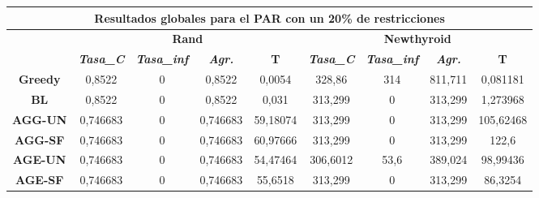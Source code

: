 \documentclass[12pt, spanish]{article}
\begin{document}
\begin{table}[H]
\footnotesize
\begin{tabular}{|c|c|c|c|c|c|c|c|c|}
\hline
\multicolumn{9}{|c|}{\textbf{Resultados globales para el PAR con un 20\% de restricciones}}                                                                                                                           \\ \hline
\multirow{2}{*}{}     & \multicolumn{4}{c|}{\textbf{Rand}}                                                            & \multicolumn{4}{c|}{\textbf{Newthyroid}}                                                      \\ \cline{2-9} 
                      & \textit{\textbf{Tasa\_C}} & \textit{\textbf{Tasa\_inf}} & \textit{\textbf{Agr.}} & \textbf{T} & \textit{\textbf{Tasa\_C}} & \textit{\textbf{Tasa\_inf}} & \textit{\textbf{Agr.}} & \textbf{T} \\ \hline
\textbf{Greedy}       & 0,8522                    & 0                           & 0,8522                 & 0,0054     & 328,86                    & 314                         & 811,711                & 0,081181   \\ \hline
\textbf{BL}           & 0,8522                    & 0                           & 0,8522                 & 0,031      & 313,299                   & 0                           & 313,299                & 1,273968   \\ \hline
\textbf{AGG-UN}       & 0,746683                  & 0                           & 0,746683               & 59,18074   & 313,299                   & 0                           & 313,299                & 105,62468  \\ \hline
\textbf{AGG-SF}       & 0,746683                  & 0                           & 0,746683               & 60,97666   & 313,299                   & 0                           & 313,299                & 122,6      \\ \hline
\textbf{AGE-UN}       & 0,746683                  & 0                           & 0,746683               & 54,47464   & 306,6012                  & 53,6                        & 389,024                & 98,99436   \\ \hline
\textbf{AGE-SF}       & 0,746683                  & 0                           & 0,746683               & 55,6518    & 313,299                   & 0                           & 313,299                & 86,3254    \\ \hline

\end{tabular}
\end{table}
\end{document}
